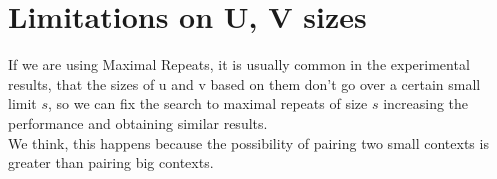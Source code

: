 	\section{Limitations on U, V sizes}

	If we are using Maximal Repeats, it is usually common in the experimental results, that the sizes of u and v based on them	don't go over a certain small limit $s$, so we can fix the search to maximal repeats
	of size $s$ increasing the performance and obtaining similar results. \\

	We think, this happens because the possibility of pairing two small contexts is greater
	than pairing big contexts.
